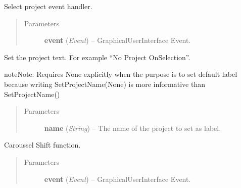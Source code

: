 \documentclass[letterpaper,10pt,english]{sphinxmanual}
\begin{document}
\begin{fulllineitems}
\begin{fulllineitems}
\begin{quote}
\begin{description}
\end{description}\end{quote}

\end{fulllineitems}


\begin{fulllineitems}
\label{diwacs:diwacs.GraphicalUserInterface.SelectProjectDialog}
Select project event handler.
\begin{quote}\begin{description}
\item[{Parameters}] \leavevmode
\textbf{event} (\emph{Event}) -- GraphicalUserInterface Event.

\end{description}\end{quote}

\end{fulllineitems}


\begin{fulllineitems}
\label{diwacs:diwacs.GraphicalUserInterface.SetProjectName}
Set the project text.
For example ``No Project OnSelection''.

\begin{notice}{note}{Note:}
Requires None explicitly when the purpose is to set default label
because writing SetProjectName(None) is more informative than
SetProjectName()
\end{notice}
\begin{quote}\begin{description}
\item[{Parameters}] \leavevmode
\textbf{name} (\emph{String}) -- The name of the project to set as label.

\end{description}\end{quote}

\end{fulllineitems}


\begin{fulllineitems}
\label{diwacs:diwacs.GraphicalUserInterface.Shift}
Caroussel Shift function.
\begin{quote}\begin{description}
\item[{Parameters}] \leavevmode
\textbf{event} (\emph{Event}) -- GraphicalUserInterface Event.


\end{description}
\end{quote}
\end{fulllineitems}
\end{fulllineitems}
\end{document}
